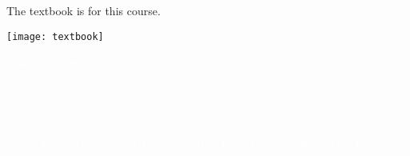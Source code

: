\documentclass[t]{beamer}
\begin{document}
\begin{frame}[t,plain]{The textbook is  for this course.}
	\begin{center}
		\texttt{[image: textbook]}
	\end{center}
\end{frame}



{
\begin{frame}[b,plain]{\textcolor{white}{What is biogeography?}}

\end{frame}
}


{
\begin{frame}[t,plain]{\textcolor{white}{What explains the distribution of organisms living here?}}

	\hangpara\textcolor{white}{Consider ecological and geological time scales.}
\end{frame}
}

{
\begin{frame}[t,plain]
\end{frame}
}

{
\begin{frame}[t,plain]
\end{frame}
}

{
\begin{frame}[t,plain]
\end{frame}
}

{
\begin{frame}[t,plain]
\end{frame}
}

{
\begin{frame}[t,plain]
\end{frame}
}



{
\begin{frame}[b,plain]{\textcolor{white}{Grand Prismatic Spring, Yellowstone NP.}}
\hfill\tiny\textcolor{white}{Clément Bardot, Wikimedia Commons}
\end{frame}
}
\end{document}
